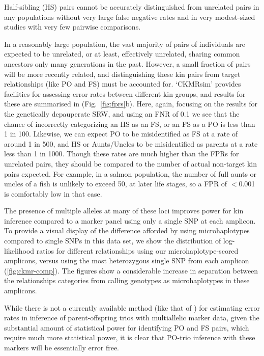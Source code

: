 Half-sibling (HS) pairs cannot be accurately
distinguished from unrelated pairs in any populations without very large false negative rates
and in very modest-sized studies with very few pairwise comparisons.  

In a reasonably large population, the vast majority of pairs of individuals are expected to
be unrelated, or at least, effectively unrelated, sharing common ancestors only many generations
in the past.  However, a small fraction of pairs will be more recently related, and distinguishing these
kin pairs from target relationships (like PO and FS) must be accounted for.  `CKMRsim' provides
facilities for assessing error rates between different kin groups, and results for these are
summarised in (Fig.~\ref{fig:fprs}b). Here, again, focusing on the results for the genetically
depauperate SRW, and using an FNR of 0.1 we see that the chance of incorrectly
categorizing an HS as an FS,  or an FS as a PO is less than 1 in 100. Likewise, 
we can expect PO to be misidentified as FS at a rate of around 1 in 500, and 
HS or Aunts/Uncles to be misidentified as parents at a rate less than 1 in 1000.
Though these rates are much higher than the FPRs for unrelated pairs, they should be
compared to the number of actual non-target kin pairs expected.  For example, in a salmon
population, the number of full aunts or uncles of a fish is unlikely to exceed 50, 
at later life stages,  so a FPR of  $<$0.001 is comfortably low in that case.  

The presence of multiple alleles at many of these loci improves power for
kin inference compared to a marker panel using only a single SNP at each
amplicon.  To provide a visual display of the difference afforded by using
microhaplotypes compared to single SNPs in this data set, we show the
distribution of log-likelihood ratios for different relationships using our microhaplotype-scored
amplicons, versus using the most heterozygous single SNP from each
amplicon (\ref{fig:ckmr-comp}).  The figures show a considerable increase
in separation between the relationships categories from calling genotypes
as microhaplotypes in these amplicons.

While there is not a currently available method (like that of \citeauthor{anderson2006power}) for estimating error rates in
inference of parent-offspring trios with multiallelic marker data, given the substantial amount of statistical power for identifying PO and FS pairs, which 
require much more statistical power, it is clear that PO-trio inference with these markers will be essentially error free.








